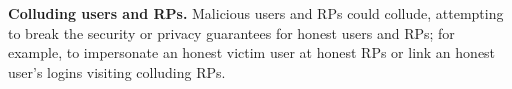 \noindent \textbf{Colluding users and RPs.}
Malicious users and RPs could collude,
 attempting to break the security or privacy guarantees for honest users and RPs;
for example, to impersonate an honest victim user at honest RPs or link an honest user's logins visiting colluding RPs.











%


